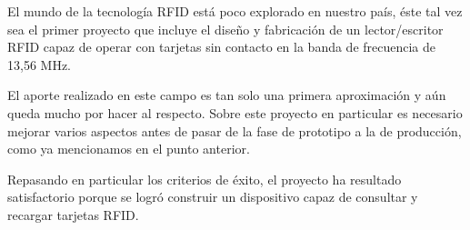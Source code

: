 \documentclass[%
        final,
        notitlepage,
        narroweqnarray,
        inline,
        ]{ieee}
\begin{document}
El mundo de la tecnología RFID está poco explorado en nuestro país, éste 
tal vez sea el primer proyecto que incluye el diseño y fabricación de un 
lector/escritor RFID capaz de operar con tarjetas sin contacto en la banda de
frecuencia de 13,56 MHz.

El aporte realizado en este campo es tan solo una primera aproximación y aún 
queda mucho por hacer al respecto. Sobre este proyecto en particular es
necesario mejorar varios aspectos antes de pasar de la fase de prototipo
a la de producción, como ya mencionamos en el punto anterior.

Repasando en particular los criterios de éxito, el proyecto ha resultado satisfactorio
porque se logró construir un dispositivo capaz de consultar y recargar tarjetas RFID.
\end{document}

